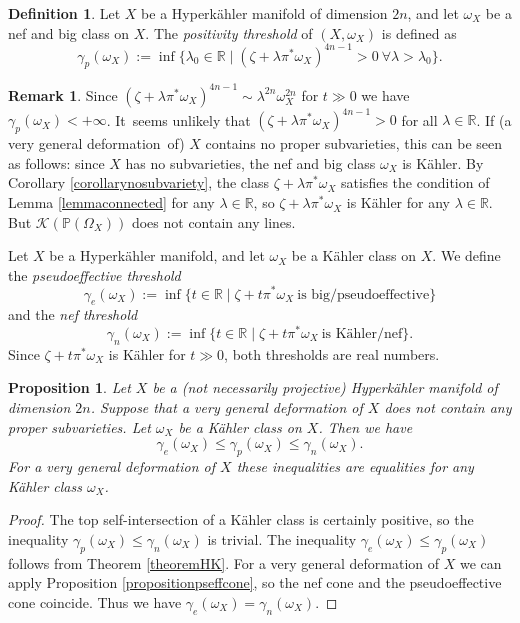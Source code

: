 \documentclass[JEP,XML,SOM,Unicode,NoEqCountersInSection,published]{cedram}
\let\mathcal\mathscr
\theoremstyle{plain}
\newtheorem{proposition}[theorem]{Proposition}
\theoremstyle{definition}
\newtheorem{definition}[theorem]{Definition}
\newtheorem{remark}[theorem]{Remark}
\newcommand{\R}{\ensuremath{\mathbb{R}}}
\newcommand{\PP}{\ensuremath{\mathbb{P}}}
\begin{document}
\begin{definition}
Let $X$ be a Hyperkähler manifold of dimension $2n$, and
let $\omega_X$ be a nef and big class on $X$.
The \emph{positivity threshold} of $(X, \omega_X)$ is defined as
\[
\gamma_p(\omega_X):=\inf \{ \lambda_0 \in \R \mid (\zeta+ \lambda \pi^*\omega_X)^{4n-1}>0\ \forall \lambda > \lambda_0 \}.
\]
\end{definition}

\begin{remark}\label{solution}
Since $(\zeta+ \lambda\pi^*\omega_X)^{4n-1}\sim \lambda ^{2n}\omega_X^{2n}$ for $t \gg 0$
we have \hbox{$\gamma_p(\omega_X)<+\infty$}.
It~seems unlikely that $(\zeta+ \lambda \pi^*\omega_X)^{4n-1}>0$ for all $\lambda \in \R$. If
(a very general deformation~of) $X$ contains no proper subvarieties, this can be seen as follows:
since $X$ has no subvarieties, the nef and big class $\omega_X$ is Kähler.
By Corollary \ref{corollarynosubvariety}, the class $\zeta+ \lambda \pi^*\omega_X$ satisfies the condition
of Lemma \ref{lemmaconnected} for any $\lambda \in \R$, so $\zeta+ \lambda \pi^*\omega_X$ is Kähler
for any $\lambda \in \R$. But $\mathcal K(\PP(\Omega_X))$ does not contain any lines.
\end{remark}

Let $X$ be a Hyperkähler manifold, and let $\omega_X$ be a Kähler class on $X$.
We define the \emph{pseudoeffective threshold}
\[
\gamma_e(\omega_X):=\inf \{ t\in \R \mid \zeta+t\pi^*\omega_X \ \text{is big/pseudoeffective}\}
\]
and the \emph{nef threshold}
\[
\gamma_n(\omega_X):=\inf \{ t\in \R \mid \zeta+t\pi^*\omega_X \ \text{is Kähler/nef}\}.
\]
Since $\zeta+t\pi^*\omega_X$ is Kähler for $t \gg 0$, both thresholds are real numbers.

\begin{proposition}\label{threshold}
Let $X$ be a (not necessarily projective) Hyperkähler manifold of dimension $2n$.
Suppose that a very general deformation of $X$ does not contain any proper subvarieties.
Let $\omega_X$ be a Kähler class on $X$.
Then we have
\[
\gamma_e(\omega_X) \leq \gamma_p(\omega_X) \leq \gamma_n(\omega_X).
\]
For a very general deformation of $X$ these inequalities are equalities for any Kähler class $\omega_X$.
\end{proposition}

\begin{proof}
The top self-intersection of a Kähler class is certainly positive, so the inequality
$\gamma_p(\omega_X) \leq \gamma_n(\omega_X)$ is trivial.
The inequality $\gamma_e (\omega_X) \leq \gamma_p(\omega_X)$
follows from Theorem \ref{theoremHK}.
For a very general deformation of $X$ we can apply Proposition \ref{propositionpseffcone},
so the nef cone and the pseudoeffective cone coincide. Thus we have $\gamma_e(\omega_X) = \gamma_n(\omega_X)$.
\end{proof}
\end{document}
